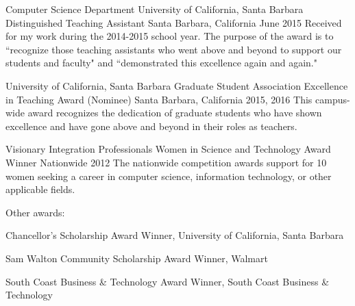 \begin{cventries}


\cventry
{Computer Science Department \newline University of California, Santa Barbara}
    {Distinguished Teaching Assistant}
    {Santa Barbara, California}
    {June 2015}
    {
      Received for my work during the 2014-2015 school year. The purpose of the award is to ``recognize those teaching assistants who went above and beyond to support our students and faculty"​ and ``demonstrated this excellence again and again."
    }

\cventry
{University of California, Santa Barbara}
    {Graduate Student Association Excellence in Teaching Award (Nominee)}
    {Santa Barbara, California}
    {2015, 2016}
    {
      This campus-wide award recognizes the dedication of graduate students who have shown excellence and have gone above and beyond in their roles as teachers.
    }

\cventry
{Visionary Integration Professionals}
    {Women in Science and Technology Award Winner}
    {Nationwide}
    {2012}
    {
      The nationwide competition awards support for 10 women seeking a career in computer science, information technology, or other applicable fields.
    }

 \cventry
{ }
{Other awards:\vspace{-2mm}}
{ }
{ }
{\begin{cvitems}
\item Chancellor's Scholarship Award Winner, University of California, Santa Barbara
\item Sam Walton Community Scholarship Award Winner, Walmart
\item South Coast Business \& Technology Award Winner, South Coast Business \& Technology
\end{cvitems}
}


%



\end{cventries}
